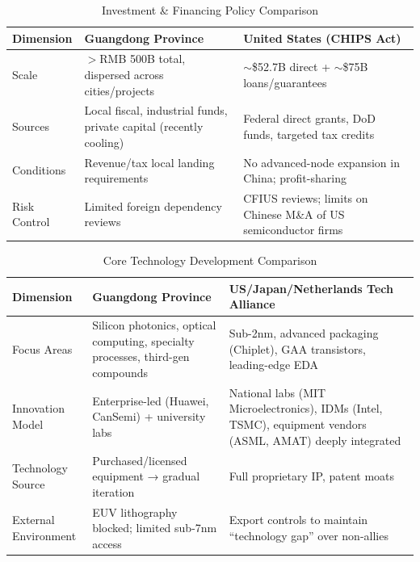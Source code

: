 \documentclass[12pt,a4paper]{article}
\newcommand{\tableHeaderRow}{\rowcolor{tealPrimary}\color{white}}
\newcommand{\tableOddRow}{\rowcolor{mintBG}}
\newcommand{\tableEvenRow}{\rowcolor{white}}
\begin{document}
\begin{table}[H]
\centering
\caption{Investment \& Financing Policy Comparison}
\label{tab:policy_investment}
\begin{tabular}{p{2.5cm}p{5cm}p{5cm}}
\toprule
\tableHeaderRow
\textbf{Dimension} & \textbf{Guangdong Province} & \textbf{United States (CHIPS Act)} \\
\midrule
\tableOddRow Scale & $>$RMB 500B total, dispersed across cities/projects & $\sim$\$52.7B direct + $\sim$\$75B loans/guarantees \\
\tableEvenRow Sources & Local fiscal, industrial funds, private capital (recently cooling) & Federal direct grants, DoD funds, targeted tax credits \\
\tableOddRow Conditions & Revenue/tax local landing requirements & No advanced-node expansion in China; profit-sharing \\
\tableEvenRow Risk Control & Limited foreign dependency reviews & CFIUS reviews; limits on Chinese M\&A of US semiconductor firms \\
\bottomrule
\end{tabular}
\end{table}

\begin{table}[H]
\centering
\caption{Core Technology Development Comparison}
\label{tab:policy_tech}
\begin{tabular}{p{2.5cm}p{5cm}p{5cm}}
\toprule
\tableHeaderRow
\textbf{Dimension} & \textbf{Guangdong Province} & \textbf{US/Japan/Netherlands Tech Alliance} \\
\midrule
\tableOddRow Focus Areas & Silicon photonics, optical computing, specialty processes, third-gen compounds & Sub-2nm, advanced packaging (Chiplet), GAA transistors, leading-edge EDA \\
\tableEvenRow Innovation Model & Enterprise-led (Huawei, CanSemi) + university labs & National labs (MIT Microelectronics), IDMs (Intel, TSMC), equipment vendors (ASML, AMAT) deeply integrated \\
\tableOddRow Technology Source & Purchased/licensed equipment → gradual iteration & Full proprietary IP, patent moats \\
\tableEvenRow External Environment & EUV lithography blocked; limited sub-7nm access & Export controls to maintain ``technology gap'' over non-allies \\
\bottomrule
\end{tabular}
\end{table}
\end{document}
